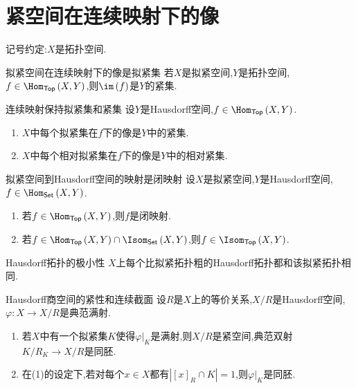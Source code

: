 \section{紧空间在连续映射下的像}

记号约定:$X$是拓扑空间.

\begin{theorem}{拟紧空间在连续映射下的像是拟紧集}{}
	若$X$是拟紧空间,$Y$是拓扑空间,$f\in\Hom_{\mathsf{Top}}\left(X,Y\right)$,则$\im\left(f\right)$是$Y$的紧集.
\end{theorem}

\begin{corollary}{连续映射保持拟紧集和紧集}{}
	设$Y$是Hausdorff空间,$f\in\Hom_{\mathsf{Top}}\left(X,Y\right)$.
	\begin{enumerate}
		\item $X$中每个拟紧集在$f$下的像是$Y$中的紧集.
		\item $X$中每个相对拟紧集在$f$下的像是$Y$中的相对紧集.
	\end{enumerate}
\end{corollary}

\begin{corollary}{拟紧空间到Hausdorff空间的映射是闭映射}{}
	设$X$是拟紧空间,$Y$是Hausdorff空间,$f\in\Hom_{\mathsf{Set}}\left(X,Y\right)$.
	\begin{enumerate}
		\item 若$f\in\Hom_{\mathsf{Top}}\left(X,Y\right)$,则$f$是闭映射.
		\item 若$f\in\Hom_{\mathsf{Top}}\left(X,Y\right)\cap\Isom_{\mathsf{Set}}\left(X,Y\right)$,则$f\in\Isom_{\mathsf{Top}}\left(X,Y\right)$.
	\end{enumerate}
\end{corollary}

\begin{corollary}{Hausdorff拓扑的极小性}{}
	$X$上每个比拟紧拓扑粗的Hausdorff拓扑都和该拟紧拓扑相同.
\end{corollary}

\begin{corollary}{Hausdorff商空间的紧性和连续截面}{}
	设$R$是$X$上的等价关系,$X/R$是Hausdorff空间,$\varphi:X\to X/R$是典范满射.
	\begin{enumerate}
		\item 若$X$中有一个拟紧集$K$使得$\varphi|_{K}$是满射,则$X/R$是紧空间,典范双射$K/R_{K}\to X/R$是同胚.
		\item 在(1)的设定下,若对每个$x\in X$都有$\left|\left[x\right]_{R}\cap K\right|=1$,则$\varphi|_{K}$是同胚.
	\end{enumerate}
\end{corollary}